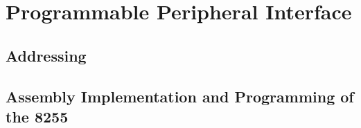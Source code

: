 \newpage
\section{Programmable Peripheral Interface}

    \subsection{Addressing}

    \subsection{Assembly Implementation and Programming of the 8255}

